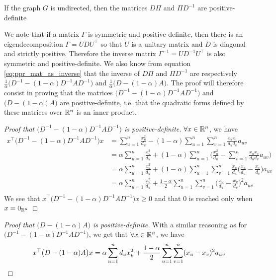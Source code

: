 \begin{theorem}\label{th:dpi_pidm_symdefpos}
    If the graph $G$ is undirected, then the matrices $D\Pi$ and $\Pi D^{-1}$ are positive-definite
\end{theorem}
We note that if a matrix $\Gamma$ is symmetric and positive-definite, then there is an eigendecomposition $\Gamma = U D U^\top$ so that $U$ is a unitary matrix and $D$ is diagonal and strictly positive. Therefore the inverse matrix $\Gamma^{-1} = U D^{-1} U^\top$ is also symmetric and positive-definite. We also know from equation \ref{eq:ppr_mat_as_inverse} that the inverse of $D\Pi$ and $\Pi D^{-1}$ are respectively $\frac{1}{\alpha} \big(D^{-1} - (1-\alpha)D^{-1} A D^{-1}\big)$ and $\frac{1}{\alpha} \big(D - (1-\alpha)A\big)$. The proof will therefore consist in proving that the matrices $\big(D^{-1} - (1-\alpha)D^{-1} A D^{-1}\big)$ and $\big(D - (1-\alpha)A\big)$ are positive-definite, i.e. that the quadratic forms defined by these matrices over $\mathbb{R}^n$ is an inner product.

\begin{proof}[Proof that $\big(D^{-1} - (1-\alpha)D^{-1} A D^{-1}\big)$ is positive-definite]

    $\forall x \in \mathbb{R}^n$, we have
    \begin{equation*}
        \begin{split}
            x^\top \big(D^{-1} - (1-\alpha)D^{-1} A D^{-1}\big) x &= \sum_{u=1}^n \frac{x_u^2}{d_u} - (1-\alpha)\sum_{u=1}^n \sum_{v=1}^n \frac{x_u x_v}{d_u d_v} a_{uv}\\
            & = \alpha \sum_{u=1}^n \frac{x_u^2}{d_u} + (1-\alpha)\sum_{u=1}^n\big(\frac{x_u^2}{d_u} - \sum_{v=1}^n \frac{x_u x_v}{d_u d_v} a_{uv}\big)\\
            & = \alpha \sum_{u=1}^n \frac{x_u^2}{d_u} + (1-\alpha)\sum_{u=1}^n\sum_{v=1}^n\frac{x_u}{d_u}\big(\frac{x_u}{d_u} - \frac{x_v}{d_v}\big)a_{uv}\\
            & = \alpha \sum_{u=1}^n \frac{x_u^2}{d_u} + \frac{1-\alpha}{2}\sum_{u=1}^n\sum_{v=1}^n\big(\frac{x_u}{d_u} - \frac{x_v}{d_v}\big)^2a_{uv}\\
        \end{split}
    \end{equation*}
    We see that $x^\top \big(D^{-1} - (1-\alpha)D^{-1} A D^{-1}\big) x \geq 0$ and that $0$ is reached only when $x=0_{\mathbb{R}^n}$
\end{proof}

\begin{proof}[Proof that $\big(D - (1-\alpha) A\big)$ is positive-definite]

With a similar reasoning as for $\allowbreak\big(D^{-1} - (1-\alpha)D^{-1} A D^{-1}\big)$, we get that $\forall x \in \mathbb{R}^n$, we have
\begin{equation*}
    x^\top\big(D - (1-\alpha) A\big)x = \alpha \sum_{u=1}^n d_u x_u^2 + \frac{1-\alpha}{2}\sum_{u=1}^n\sum_{v=1}^n(x_u - x_v)^2a_{uv}\\ 
\end{equation*}
\end{proof}

